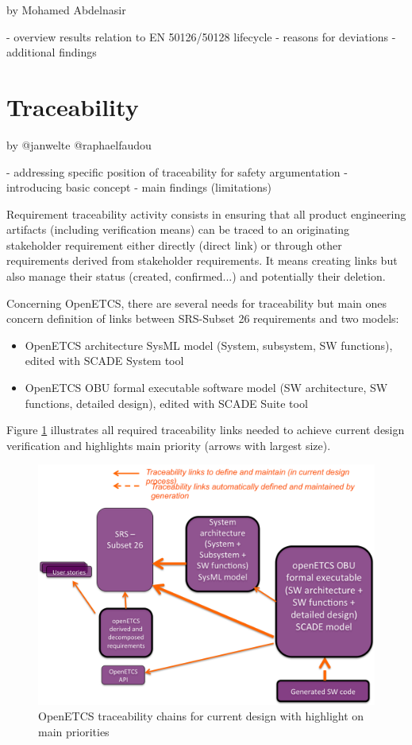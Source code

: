 \documentclass{template/openetcs_report}
\begin{document}
by Mohamed Abdelnasir

- overview results relation to EN 50126/50128 lifecycle 
- reasons for deviations
- additional findings

\section{Traceability}

by @janwelte @raphaelfaudou

- addressing specific position of traceability for safety argumentation
- introducing basic concept
- main findings (limitations)

Requirement traceability activity consists in ensuring that all product engineering artifacts (including verification means) can be traced to an originating stakeholder requirement either directly (direct link) or through other requirements derived from stakeholder requirements. It means creating links but also manage their status (created, confirmed...) and potentially their deletion.

Concerning OpenETCS, there are several needs for traceability but main ones concern definition of links between SRS-Subset 26 requirements and two models:
\begin{itemize}
\item OpenETCS architecture SysML model (System, subsystem, SW functions), edited with SCADE System tool
\item OpenETCS OBU formal executable software model (SW architecture, SW functions, detailed design), edited with SCADE Suite tool
\end{itemize}

Figure \ref{fig:openETCSTraceabilityMainPriority} illustrates all required traceability links needed to achieve current design verification and highlights main priority (arrows with largest size).

\begin{figure}[htbp]
\centering
\includegraphics[width=.9\linewidth]
{./images/openETCSTraceabilityMainPriority.png}
\caption{\label{fig:openETCSTraceabilityMainPriority}OpenETCS traceability chains for current design with highlight on main priorities}
\end{figure}
\end{document}
